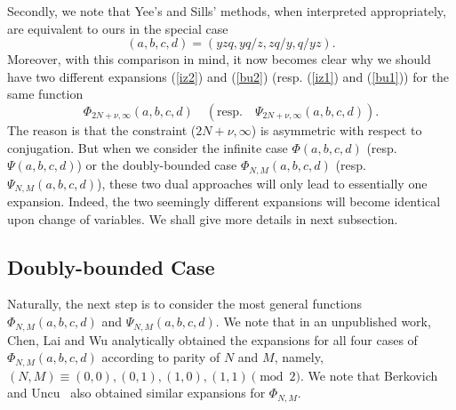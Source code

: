 \documentclass[12pt]{amsart}
\numberwithin{equation}{section}
\theoremstyle{plain}
\theoremstyle{definition}
\begin{document}
Secondly, we note that Yee's \cite{yee} and Sills' \cite{sil} methods, when interpreted appropriately, are equivalent to ours in the special case 
$$(a,b,c,d)=(yzq,yq/z,zq/y,q/yz).
$$ 
Moreover, with this comparison in mind, it now becomes clear why we should have two different expansions (\ref{iz2}) and (\ref{bu2}) (resp. (\ref{iz1}) and (\ref{bu1})) for the same function 
$$\Phi_{2N+\nu,\infty}(a,b,c,d)\quad  (\text{resp.}\quad  \Psi_{2N+\nu,\infty}(a,b,c,d)). 
$$
The  reason is that  the constraint ($2N+\nu,\infty$) is asymmetric with respect to conjugation. But when we consider the infinite case $\Phi(a,b,c,d)$ (resp. $\Psi(a,b,c,d)$) or the doubly-bounded case $\Phi_{N,M}(a,b,c,d)$ (resp. $\Psi_{N,M}(a,b,c,d)$), these two dual approaches will only lead to essentially one expansion. Indeed, the two seemingly different expansions will become identical upon change of variables. We shall give more details in next subsection.












\subsection{Doubly-bounded Case}
Naturally, the next step is to consider the most general functions $\Phi_{N,M}(a,b,c,d)$ and $\Psi_{N,M}(a,b,c,d)$. We note that in an unpublished work, Chen, Lai and Wu \cite{clw} analytically obtained the expansions for all four cases of $\Phi_{N,M}(a,b,c,d)$ according to parity of $N$ and $M$, namely, 
$(N,M)\equiv (0,0),(0,1),(1,0),(1,1) \pmod 2$.
We note that Berkovich and Uncu~\cite[Theorems 6.2 and 6.3]{bu2} also obtained 
similar expansions for $\Phi_{N,M}$. 
\end{document}
